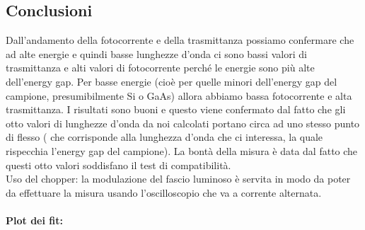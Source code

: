 \documentclass{article}
\begin{document}
\subsection{Conclusioni}
Dall'andamento della fotocorrente e della trasmittanza possiamo confermare che ad alte energie e quindi basse lunghezze d'onda ci sono bassi valori di trasmittanza e alti valori di fotocorrente perché le energie sono più alte dell'energy gap.  Per basse energie (cioè per quelle minori dell'energy gap del campione, presumibilmente Si   o GaAs) allora abbiamo bassa fotocorrente e alta trasmittanza. I risultati sono buoni e questo viene confermato dal fatto che gli otto valori di lunghezze d'onda da noi calcolati portano circa ad uno stesso punto di flesso ( che corrisponde alla lunghezza d'onda che ci interessa, la quale rispecchia l'energy gap del campione). La bontà della misura è data dal fatto che questi otto valori soddisfano il test di compatibilità.
\\
Uso del chopper: la modulazione del fascio luminoso è servita in modo da poter da effettuare la misura usando l'oscilloscopio che va a corrente alternata.

\newpage
\paragraph{Plot dei fit: }
\end{document}
